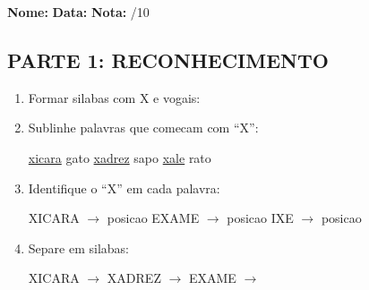 \begin{exercicio}
\noindent\textbf{Nome:} \underline{\hspace{3.2cm}} \quad \textbf{Data:} \underline{\hspace{1.6cm}} \quad \textbf{Nota:} \underline{\hspace{0.9cm}}/10

\subsection*{PARTE 1: RECONHECIMENTO}

\begin{enumerate}
  \item Formar silabas com X e vogais:
  \begin{center}
   \quad {} \quad {} \quad {} \quad {}
  \end{center}

  \item Sublinhe palavras que comecam com ``X'':
  \begin{center}
  \uline{xicara} \quad gato \quad \uline{xadrez} \quad sapo \quad \uline{xale} \quad rato
  \end{center}

  \item Identifique o ``X'' em cada palavra:
  \begin{center}
  XICARA $\rightarrow$ posicao \underline{\hspace{1cm}} \quad EXAME $\rightarrow$ posicao \underline{\hspace{1cm}} \quad IXE $\rightarrow$ posicao \underline{\hspace{1cm}}
  \end{center}

  \item Separe em silabas:
  \begin{center}
  XICARA $\rightarrow$ \underline{\hspace{1cm}} \underline{\hspace{1cm}} \underline{\hspace{1cm}} \quad XADREZ $\rightarrow$ \underline{\hspace{1cm}} \underline{\hspace{1cm}} \quad EXAME $\rightarrow$ \underline{\hspace{1cm}} \underline{\hspace{1cm}} \underline{\hspace{1cm}}
  \end{center}


\end{enumerate}
\end{exercicio}
